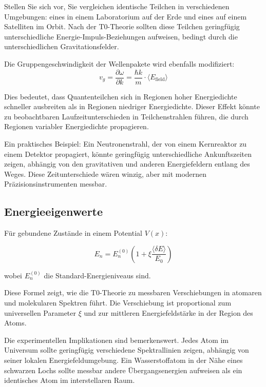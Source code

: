\documentclass[12pt,a4paper]{article}
\newcommand{\deltaE}{\delta E}
\newcommand{\xipar}{\xi}
\theoremstyle{definition}
\theoremstyle{remark}
\begin{document}
Stellen Sie sich vor, Sie vergleichen identische Teilchen in verschiedenen Umgebungen: eines in einem Laboratorium auf der Erde und eines auf einem Satelliten im Orbit. Nach der T0-Theorie sollten diese Teilchen geringfügig unterschiedliche Energie-Impuls-Beziehungen aufweisen, bedingt durch die unterschiedlichen Gravitationsfelder.

Die Gruppengeschwindigkeit der Wellenpakete wird ebenfalls modifiziert:
$$v_g = \frac{\partial \omega}{\partial k} = \frac{\hbar k}{m} \cdot \langle E_{\text{field}} \rangle$$

Dies bedeutet, dass Quantenteilchen sich in Regionen hoher Energiedichte schneller ausbreiten als in Regionen niedriger Energiedichte. Dieser Effekt könnte zu beobachtbaren Laufzeitunterschieden in Teilchenstrahlen führen, die durch Regionen variabler Energiedichte propagieren.

Ein praktisches Beispiel: Ein Neutronenstrahl, der von einem Kernreaktor zu einem Detektor propagiert, könnte geringfügig unterschiedliche Ankunftszeiten zeigen, abhängig von den gravitativen und anderen Energiefeldern entlang des Weges. Diese Zeitunterschiede wären winzig, aber mit modernen Präzisionsinstrumenten messbar.

\subsection{Energieeigenwerte}

Für gebundene Zustände in einem Potential $V(x)$:

\begin{equation}
	E_n = E_n^{(0)} \left(1 + \xipar \frac{\langle \deltaE \rangle}{E_0}\right)
	\label{eq:energy_shift}
\end{equation}

wobei $E_n^{(0)}$ die Standard-Energieniveaus sind.

Diese Formel zeigt, wie die T0-Theorie zu messbaren Verschiebungen in atomaren und molekularen Spektren führt. Die Verschiebung ist proportional zum universellen Parameter $\xipar$ und zur mittleren Energiefeldstärke in der Region des Atoms.

Die experimentellen Implikationen sind bemerkenswert. Jedes Atom im Universum sollte geringfügig verschiedene Spektrallinien zeigen, abhängig von seiner lokalen Energiefeldumgebung. Ein Wasserstoffatom in der Nähe eines schwarzen Lochs sollte messbar andere Übergangsenergien aufweisen als ein identisches Atom im interstellaren Raum.
\end{document}
